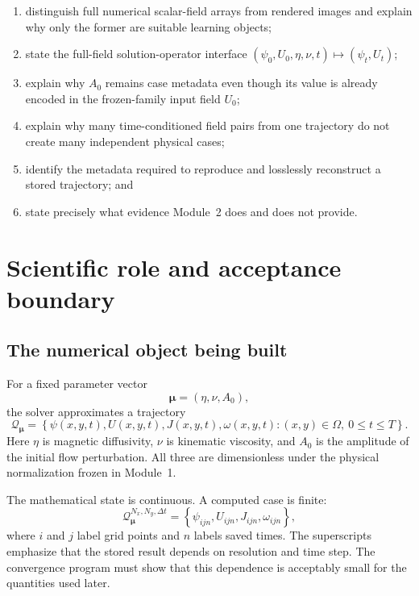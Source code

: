 \documentclass[11pt]{article}
\newcommand{\vect}[1]{\bm{#1}}
\begin{document}
\begin{enumerate}[label=\arabic*.]
  \item distinguish full numerical scalar-field arrays from rendered images and explain why only the former are suitable learning objects;
  \item state the full-field solution-operator interface $(\psi_0,U_0,\eta,\nu,t)\mapsto(\psi_t,U_t)$;
  \item explain why $A_0$ remains case metadata even though its value is already encoded in the frozen-family input field $U_0$;
  \item explain why many time-conditioned field pairs from one trajectory do not create many independent physical cases;
  \item identify the metadata required to reproduce and losslessly reconstruct a stored trajectory; and
  \item state precisely what evidence Module~2 does and does not provide.
\end{enumerate}

\ProjectTOC
\clearpage
{}

\section{Scientific role and acceptance boundary}
\label{sec:role}

\subsection{The numerical object being built}

For a fixed parameter vector
\begin{equation}
\vect{\mu}=(\eta,\nu,A_0),
\end{equation}
the solver approximates a trajectory
\begin{equation}
\mathcal{Q}_{\vect{\mu}}
=\left\{\psi(x,y,t),U(x,y,t),J(x,y,t),\omega(x,y,t):
(x,y)\in\Omega,\ 0\le t\le T\right\}.
\end{equation}
Here $\eta$ is magnetic diffusivity, $\nu$ is kinematic viscosity, and $A_0$ is the amplitude of the initial flow perturbation. All three are dimensionless under the physical normalization frozen in Module~1.

The mathematical state is continuous. A computed case is finite:
\begin{equation}
\mathcal{Q}^{N_x,N_y,\Delta t}_{\vect{\mu}}
=\left\{\psi_{ijn},U_{ijn},J_{ijn},\omega_{ijn}\right\},
\end{equation}
where $i$ and $j$ label grid points and $n$ labels saved times. The superscripts emphasize that the stored result depends on resolution and time step. The convergence program must show that this dependence is acceptably small for the quantities used later.
\end{document}
